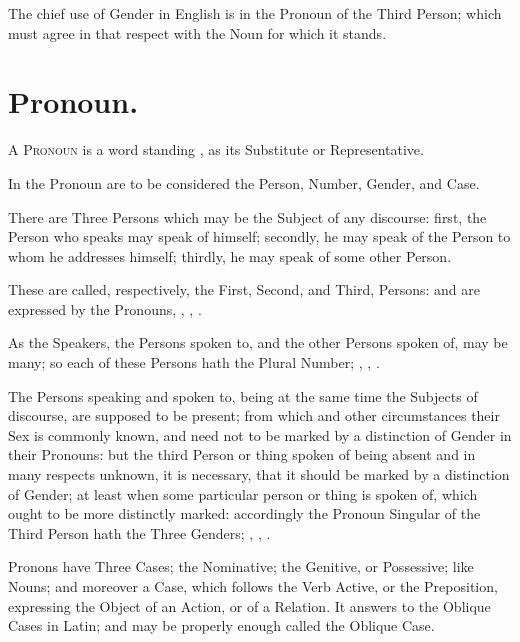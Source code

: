 The chief use of Gender in English is in the Pronoun of the Third
Person; which must agree in that respect with the Noun for which it
stands.

\section{Pronoun.}

\textsc{A Pronoun} is a word standing , as its
Substitute or Representative.

In the Pronoun are to be considered the Person, Number, Gender, and
Case.

There are Three Persons which may be the Subject of any discourse:
first, the Person who speaks may speak of himself; secondly, he may
speak of the Person to whom he addresses himself; thirdly, he may speak
of some other Person.

These are called, respectively, the First, Second, and Third, Persons:
and are expressed by the Pronouns, , , .

As the Speakers, the Persons spoken to, and the other Persons spoken of,
may be many; so each of these Persons hath the Plural Number; ,
, .

The Persons speaking and spoken to, being at the same time the Subjects
of discourse, are supposed to be present; from which and other
circumstances their Sex is commonly known, and need not to be marked by
a distinction of Gender in their Pronouns: but the third Person or thing
spoken of being absent and in many respects unknown, it is necessary,
that it should be marked by a distinction of Gender; at least when some
particular person or thing is spoken of, which ought to be more
distinctly marked: accordingly the Pronoun Singular of the Third Person
hath the Three Genders; , , .

Pronons have Three Cases; the Nominative; the Genitive, or Possessive;
like Nouns; and moreover a Case, which follows the Verb Active, or the
Preposition, expressing the Object of an Action, or of a Relation. It
answers to the Oblique Cases in Latin; and may be properly enough called
the Oblique Case.

